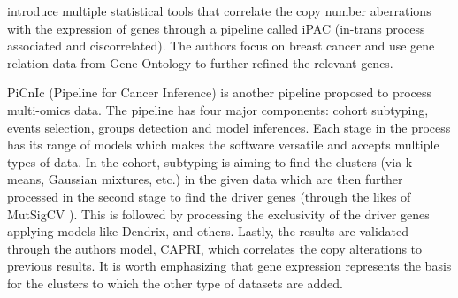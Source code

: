 
\citet{Aure2013-je} introduce multiple statistical tools that correlate the copy number aberrations with the expression of genes through a pipeline called iPAC (in-trans process associated and ciscorrelated). The authors focus on breast cancer and use gene relation data from Gene Ontology\cite{Carbon2018-ah} to further refined the relevant genes.



PiCnIc (Pipeline for Cancer Inference)\cite{Caravagna2016-vw} is another pipeline proposed to process multi-omics data. The pipeline has four major components: cohort subtyping, events selection, groups detection and model inferences\cite{Caravagna2016-vw}. Each stage in the process has its range of models which makes the software versatile and accepts multiple types of data. In the cohort, subtyping is aiming to find the clusters (via k-means, Gaussian mixtures, etc.) in the given data which are then further processed in the second stage to find the driver genes (through the likes of MutSigCV \cite{Lawrence2013-pl}). This is followed by processing the exclusivity of the driver genes applying models like Dendrix\cite{Vandin2012-cf}, \cite{Zhao2012-wj} and others. Lastly, the results are validated through the authors model, CAPRI, which correlates the copy alterations to previous results. It is worth emphasizing that gene expression represents the basis for the clusters to which the other type of datasets are added.


